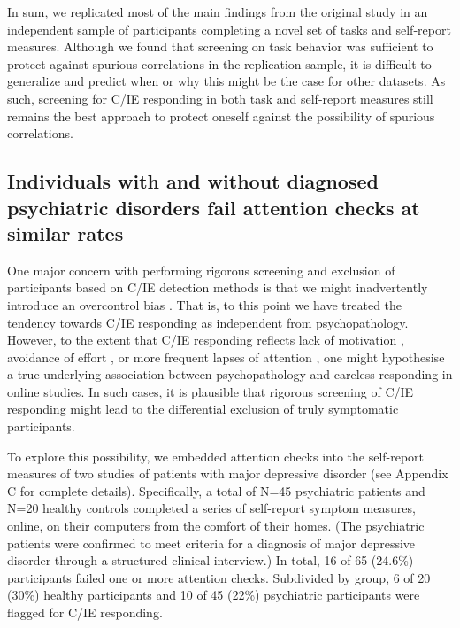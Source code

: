 \documentclass[a4paper,notitlepage,12pt]{article}
\begin{document}
\begin{refsection}[main]
In sum, we replicated most of the main findings from the original study in an independent sample of participants completing a novel set of tasks and self-report measures. Although we found that screening on task behavior was sufficient to protect against spurious correlations in the replication sample, it is difficult to generalize and predict when or why this might be the case for other datasets. As such, screening for C/IE responding in both task and self-report measures still remains the best approach to protect oneself against the possibility of spurious correlations.

\subsection{Individuals with and without diagnosed psychiatric disorders fail attention checks at similar rates}

One major concern with performing rigorous screening and exclusion of participants based on C/IE detection methods is that we might inadvertently introduce an overcontrol bias \cite{elwert2014endogenous}. That is, to this point we have treated the tendency towards C/IE responding as independent from psychopathology. However, to the extent that C/IE responding reflects lack of motivation \cite{barch2015mechanisms}, avoidance of effort \cite{cohen2001impairments, culbreth2016negative}, or more frequent lapses of attention \cite{kane2016individual, robison2017neurotic}, one might hypothesise a true underlying association between psychopathology and careless responding in online studies. In such cases, it is plausible that rigorous screening of C/IE responding might lead to the differential exclusion of truly symptomatic participants. 

To explore this possibility, we embedded attention checks into the self-report measures of two studies of patients with major depressive disorder (see Appendix C for complete details). Specifically, a total of N=45 psychiatric patients and N=20 healthy controls completed a series of self-report symptom measures, online, on their computers from the comfort of their homes. (The psychiatric patients were confirmed to meet criteria for a diagnosis of major depressive disorder through a structured clinical interview.) In total, 16 of 65 (24.6\%) participants failed one or more attention checks. Subdivided by group, 6 of 20 (30\%) healthy participants and 10 of 45 (22\%) psychiatric participants were flagged for C/IE responding.


\end{refsection}
\end{document}

